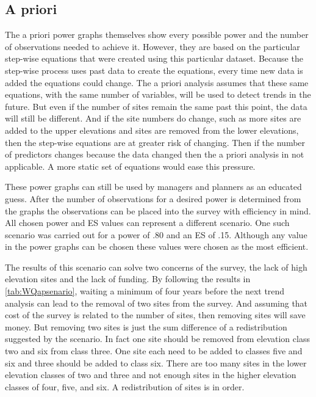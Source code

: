 \subsection{A priori}%

The a priori power graphs themselves show every possible power and the number of observations needed to achieve it.
However, they are based on the particular step-wise equations that were created using this particular dataset.
Because the step-wise process uses past data to create the equations, every time new data is added the equations could change.
The a priori analysis assumes that these same equations, with the same number of variables, will be used to detect trends in the future.
But even if the number of sites remain the same past this point, the data will still be different.
And if the site numbers do change, such as more sites are added to the upper elevations and sites are removed from the lower elevations, then the step-wise equations are at greater risk of changing.
Then if the number of predictors changes because the data changed then the a priori analysis in not applicable.
A more static set of equations would ease this pressure.

These power graphs can still be used by managers and planners as an educated guess.
After the number of observations for a desired power is determined from the graphs the observations can be placed into the survey with efficiency in mind.
All chosen power and ES values can represent a different scenario.
One such scenario was carried out for a power of .80 and an ES of .15.
Although any value in the power graphs can be chosen these values were chosen as the most efficient. 

The results of this scenario can solve two concerns of the survey, the lack of high elevation sites and the lack of funding.
By following the results in \autoref{tab:WQapsenario}, waiting a minimum of four years before the next trend analysis can lead to the removal of two sites from the survey.
And assuming that cost of the survey is related to the number of sites, then removing sites will save money.
But removing two sites is just the sum difference of a redistribution suggested by the scenario.
In fact one site should be removed from elevation class two and six from class three.
One site each need to be added to classes five and six and three should be added to class six.
There are too many sites in the lower elevation classes of two and three and not enough sites in the higher elevation classes of four, five, and six.
A redistribution of sites is in order.
